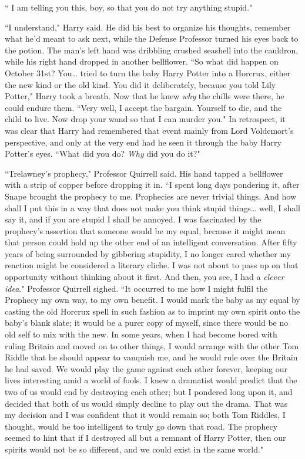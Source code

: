 `` I am telling you this, boy, so that you do not try anything stupid."

``I understand," Harry said. He did his best to organize his thoughts, remember what he'd meant to ask next, while the Defense Professor turned his eyes back to the potion. The man's left hand was dribbling crushed seashell into the cauldron, while his right hand dropped in another bellflower. ``So what did happen on October 31st? You{\ldots} tried to turn the baby Harry Potter into a Horcrux, either the new kind or the old kind. You did it deliberately, because you told Lily Potter," Harry took a breath. Now that he knew \emph{why} the chills were there, he could endure them. ``Very well, I accept the bargain. Yourself to die, and the child to live. Now drop your wand so that I can murder you." In retrospect, it was clear that Harry had remembered that event mainly from Lord Voldemort's perspective, and only at the very end had he seen it through the baby Harry Potter's eyes. ``What did you do? \emph{Why} did you do it?"

``Trelawney's prophecy," Professor Quirrell said. His hand tapped a bellflower with a strip of copper before dropping it in. ``I spent long days pondering it, after Snape brought the prophecy to me. Prophecies are never trivial things. And how shall I put this in a way that does not make you think stupid things{\ldots} well, I shall say it, and if you are stupid I shall be annoyed. I was fascinated by the prophecy's assertion that someone would be my equal, because it might mean that person could hold up the other end of an intelligent conversation. After fifty years of being surrounded by gibbering stupidity, I no longer cared whether my reaction might be considered a literary cliche. I was not about to pass up on that opportunity without thinking about it first. And then, you see, I had a \emph{clever idea}." Professor Quirrell sighed. ``It occurred to me how I might fulfil the Prophecy my own way, to my own benefit. I would mark the baby as my equal by casting the old Horcrux spell in such fashion as to imprint my own spirit onto the baby's blank slate; it would be a purer copy of myself, since there would be no old self to mix with the new. In some years, when I had become bored with ruling Britain and moved on to other things, I would arrange with the other Tom Riddle that he should appear to vanquish me, and he would rule over the Britain he had saved. We would play the game against each other forever, keeping our lives interesting amid a world of fools. I knew a dramatist would predict that the two of us would end by destroying each other; but I pondered long upon it, and decided that both of us would simply decline to play out the drama. That was my decision and I was confident that it would remain so; both Tom Riddles, I thought, would be too intelligent to truly go down that road. The prophecy seemed to hint that if I destroyed all but a remnant of Harry Potter, then our spirits would not be so different, and we could exist in the same world."


